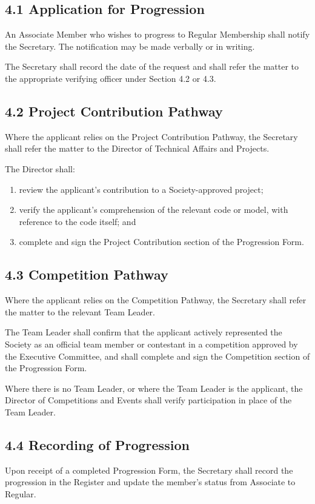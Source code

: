 \documentclass[a4paper]{article}
\begin{document}
\subsection*{4.1 Application for Progression}
An Associate Member who wishes to progress to Regular Membership shall
notify the Secretary. The notification may be made verbally or in
writing.

The Secretary shall record the date of the request and shall refer the
matter to the appropriate verifying officer under Section 4.2 or 4.3.

\subsection*{4.2 Project Contribution Pathway}
Where the applicant relies on the Project Contribution Pathway, the
Secretary shall refer the matter to the Director of Technical Affairs
and Projects.

The Director shall:
\begin{enumerate}
  \item review the applicant's contribution to a Society-approved project;
  \item verify the applicant's comprehension of the relevant code or model, with reference to the code itself; and
  \item complete and sign the Project Contribution section of the Progression Form.
\end{enumerate}

\subsection*{4.3 Competition Pathway}
Where the applicant relies on the Competition Pathway, the Secretary
shall refer the matter to the relevant Team Leader.

The Team Leader shall confirm that the applicant actively represented
the Society as an official team member or contestant in a competition
approved by the Executive Committee, and shall complete and sign the
Competition section of the Progression Form.

Where there is no Team Leader, or where the Team Leader is the
applicant, the Director of Competitions and Events shall verify
participation in place of the Team Leader.

\subsection*{4.4 Recording of Progression}
Upon receipt of a completed Progression Form, the Secretary shall record the progression in the Register and update the member's status from Associate to Regular.
\end{document}

